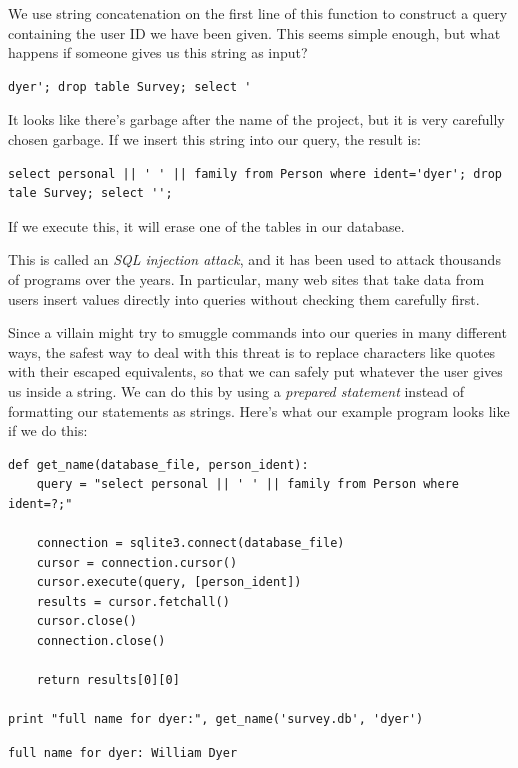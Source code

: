 \documentclass[]{book}
\newcommand{\gdef}[2]{\emph{#2}}
\begin{document}
We use string concatenation on the first line of this function to
construct a query containing the user ID we have been given. This seems
simple enough, but what happens if someone gives us this string as
input?

\begin{verbatim}
dyer'; drop table Survey; select '
\end{verbatim}

It looks like there's garbage after the name of the project, but it is
very carefully chosen garbage. If we insert this string into our query,
the result is:

\begin{verbatim}
select personal || ' ' || family from Person where ident='dyer'; drop tale Survey; select '';
\end{verbatim}

If we execute this, it will erase one of the tables in our database.

This is called an \gdef{g:sql-injection-attack}{SQL injection
attack}, and it has been used to attack thousands of programs over the
years. In particular, many web sites that take data from users insert
values directly into queries without checking them carefully first.

Since a villain might try to smuggle commands into our queries in many
different ways, the safest way to deal with this threat is to replace
characters like quotes with their escaped equivalents, so that we can
safely put whatever the user gives us inside a string. We can do this by
using a \gdef{g:prepared-statement}{prepared statement} instead of
formatting our statements as strings. Here's what our example program
looks like if we do this:

\begin{verbatim}
def get_name(database_file, person_ident):
    query = "select personal || ' ' || family from Person where ident=?;"

    connection = sqlite3.connect(database_file)
    cursor = connection.cursor()
    cursor.execute(query, [person_ident])
    results = cursor.fetchall()
    cursor.close()
    connection.close()

    return results[0][0]

print "full name for dyer:", get_name('survey.db', 'dyer')
\end{verbatim}

\begin{verbatim}
full name for dyer: William Dyer
\end{verbatim}
\end{document}
